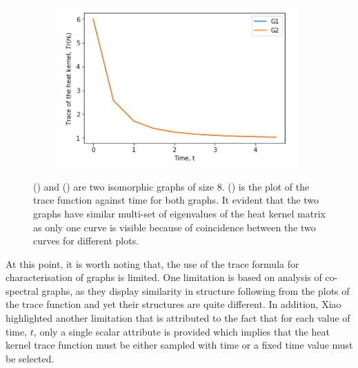 \documentclass[10pt,a4paper]{article}
\begin{document}
\begin{figure}[H]
\begin{subfigure}[b]{0.30\textwidth}
        		\caption{}
        		\label{cospectralgraph2}
        	\end{subfigure}~
        	\begin{subfigure}[b]{0.35\textwidth}
        		\includegraphics[width= \textwidth]{images/trace-cospectral.png}
        		\caption{}
        		\label{cospectracegraphplot}
        	\end{subfigure}
        	\caption{() and ()  are two isomorphic graphs of size $8$. () is the plot of the trace function against time for both graphs. It evident that the two graphs have similar multi-set of eigenvalues of the heat kernel matrix as only one curve is visible because of coincidence between the two curves for different plots. }
        	\label{TraceCospectral}
        \end{figure}
        
        At this point, it is worth noting that, the use of the trace formula for characterisation of graphs is limited. One limitation is based on analysis of co-spectral graphs, as they display similarity in structure following from the plots of the trace function and yet their structures are quite different. In addition, Xiao \citep{xiao2009graph} highlighted another limitation that is attributed to the fact that for each value of time, $t$, only a single scalar attribute is provided which implies that the heat kernel trace function must be either sampled with time or a fixed time value must be selected.  
        
\end{document}

